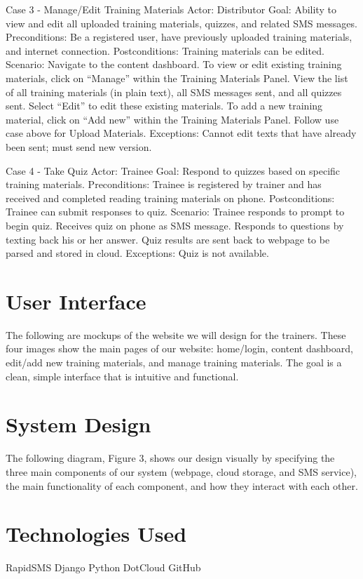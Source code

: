 Case 3 - Manage/Edit Training Materials
Actor: Distributor
Goal: Ability to view and edit all uploaded training materials, quizzes, and related SMS messages.
Preconditions: Be a registered user, have previously uploaded training materials, and internet connection.
Postconditions: Training materials can be edited.
Scenario: 
Navigate to the content dashboard.
To view or edit existing training materials, click on “Manage” within the Training Materials Panel.
View the list of all training materials (in plain text), all SMS messages sent, and all quizzes sent.
Select “Edit” to edit these existing materials.
To add a new training material, click on “Add new” within the Training Materials Panel.
Follow use case above for Upload Materials.
Exceptions:
Cannot edit texts that have already been sent; must send new version.

Case 4 - Take Quiz
Actor: Trainee
Goal: Respond to quizzes based on specific training materials.
Preconditions: Trainee is registered by trainer and has received and completed reading training materials on phone.
Postconditions: Trainee can submit responses to quiz.
Scenario: 
Trainee responds to prompt to begin quiz.
Receives quiz on phone as SMS message.
Responds to questions by texting back his or her answer.
Quiz results are sent back to webpage to be parsed and stored in cloud.
Exceptions:
Quiz is not available.


\section{User Interface}
The following are mockups of the website we will design for the trainers. These four images show the main pages of our website: home/login, content dashboard, edit/add new training materials, and manage training materials. The goal is a clean, simple interface that is intuitive and functional.

\section{System Design}
The following diagram, Figure 3, shows our design visually by specifying the three main components of our system (webpage, cloud storage, and SMS service), the main functionality of each component, and how they interact with each other.

\section{Technologies Used}
RapidSMS
Django
Python
DotCloud
GitHub

